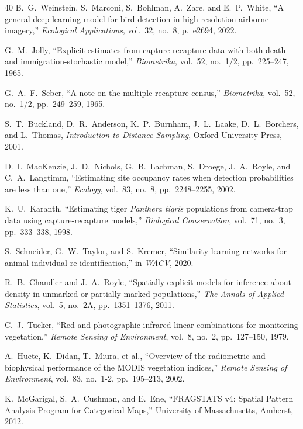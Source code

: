 \documentclass[11pt,letterpaper]{article}
\begin{document}
\begin{thebibliography}{40}
B.~G.~Weinstein, S.~Marconi, S.~Bohlman, A.~Zare, and E.~P.~White, ``A general deep learning model for bird detection in high-resolution airborne imagery,'' \emph{Ecological Applications}, vol.~32, no.~8, p.~e2694, 2022.

G.~M.~Jolly, ``Explicit estimates from capture-recapture data with both death and immigration-stochastic model,'' \emph{Biometrika}, vol.~52, no.~1/2, pp.~225--247, 1965.

G.~A.~F.~Seber, ``A note on the multiple-recapture census,'' \emph{Biometrika}, vol.~52, no.~1/2, pp.~249--259, 1965.

S.~T.~Buckland, D.~R.~Anderson, K.~P.~Burnham, J.~L.~Laake, D.~L.~Borchers, and L.~Thomas, \emph{Introduction to Distance Sampling}, Oxford University Press, 2001.

D.~I.~MacKenzie, J.~D.~Nichols, G.~B.~Lachman, S.~Droege, J.~A.~Royle, and C.~A.~Langtimm, ``Estimating site occupancy rates when detection probabilities are less than one,'' \emph{Ecology}, vol.~83, no.~8, pp.~2248--2255, 2002.

K.~U.~Karanth, ``Estimating tiger \emph{Panthera tigris} populations from camera-trap data using capture-recapture models,'' \emph{Biological Conservation}, vol.~71, no.~3, pp.~333--338, 1998.

S.~Schneider, G.~W.~Taylor, and S.~Kremer, ``Similarity learning networks for animal individual re-identification,'' in \emph{WACV}, 2020.

R.~B.~Chandler and J.~A.~Royle, ``Spatially explicit models for inference about density in unmarked or partially marked populations,'' \emph{The Annals of Applied Statistics}, vol.~5, no.~2A, pp.~1351--1376, 2011.

C.~J.~Tucker, ``Red and photographic infrared linear combinations for monitoring vegetation,'' \emph{Remote Sensing of Environment}, vol.~8, no.~2, pp.~127--150, 1979.

A.~Huete, K.~Didan, T.~Miura, et al., ``Overview of the radiometric and biophysical performance of the MODIS vegetation indices,'' \emph{Remote Sensing of Environment}, vol.~83, no.~1-2, pp.~195--213, 2002.

K.~McGarigal, S.~A.~Cushman, and E.~Ene, ``FRAGSTATS v4: Spatial Pattern Analysis Program for Categorical Maps,'' University of Massachusetts, Amherst, 2012.


\end{thebibliography}
\end{document}
